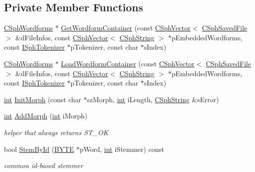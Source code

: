\subsection*{Private Member Functions}
\begin{DoxyCompactItemize}
\item 
\hyperlink{structCSphWordforms}{C\-Sph\-Wordforms} $\ast$ \hyperlink{structCSphTemplateDictTraits_ae1c8dfd42e252900175db89c8580cad3}{Get\-Wordform\-Container} (const \hyperlink{classCSphVector}{C\-Sph\-Vector}$<$ \hyperlink{structCSphSavedFile}{C\-Sph\-Saved\-File} $>$ \&d\-File\-Infos, const \hyperlink{classCSphVector}{C\-Sph\-Vector}$<$ \hyperlink{structCSphString}{C\-Sph\-String} $>$ $\ast$p\-Embedded\-Wordforms, const \hyperlink{classISphTokenizer}{I\-Sph\-Tokenizer} $\ast$p\-Tokenizer, const char $\ast$s\-Index)
\item 
\hyperlink{structCSphWordforms}{C\-Sph\-Wordforms} $\ast$ \hyperlink{structCSphTemplateDictTraits_af2491108fb330b5a859230f3bac1f693}{Load\-Wordform\-Container} (const \hyperlink{classCSphVector}{C\-Sph\-Vector}$<$ \hyperlink{structCSphSavedFile}{C\-Sph\-Saved\-File} $>$ \&d\-File\-Infos, const \hyperlink{classCSphVector}{C\-Sph\-Vector}$<$ \hyperlink{structCSphString}{C\-Sph\-String} $>$ $\ast$p\-Embedded\-Wordforms, const \hyperlink{classISphTokenizer}{I\-Sph\-Tokenizer} $\ast$p\-Tokenizer, const char $\ast$s\-Index)
\item 
\hyperlink{sphinxexpr_8cpp_a4a26e8f9cb8b736e0c4cbf4d16de985e}{int} \hyperlink{structCSphTemplateDictTraits_a8fa6641a5e6014492a155212839726bc}{Init\-Morph} (const char $\ast$sz\-Morph, \hyperlink{sphinxexpr_8cpp_a4a26e8f9cb8b736e0c4cbf4d16de985e}{int} i\-Length, \hyperlink{structCSphString}{C\-Sph\-String} \&s\-Error)
\item 
\hyperlink{sphinxexpr_8cpp_a4a26e8f9cb8b736e0c4cbf4d16de985e}{int} \hyperlink{structCSphTemplateDictTraits_ad9cd75802de5bda361bf6d9f191f9198}{Add\-Morph} (\hyperlink{sphinxexpr_8cpp_a4a26e8f9cb8b736e0c4cbf4d16de985e}{int} i\-Morph)
\begin{DoxyCompactList}\small\item\em helper that always returns S\-T\-\_\-\-O\-K \end{DoxyCompactList}\item 
bool \hyperlink{structCSphTemplateDictTraits_a232f1c0024b3b253736cc3aa75732e0c}{Stem\-By\-Id} (\hyperlink{sphinxstd_8h_a4ae1dab0fb4b072a66584546209e7d58}{B\-Y\-T\-E} $\ast$p\-Word, \hyperlink{sphinxexpr_8cpp_a4a26e8f9cb8b736e0c4cbf4d16de985e}{int} i\-Stemmer) const 
\begin{DoxyCompactList}\small\item\em common id-\/based stemmer \end{DoxyCompactList}\item 

\end{DoxyCompactItemize}
